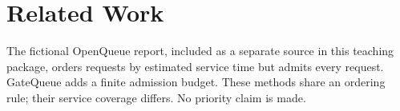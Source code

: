 \section{Related Work}\label{sec:related}
The fictional OpenQueue report, included as a separate source in this teaching
package, orders requests by estimated service time but admits every request.
GateQueue adds a finite admission budget. These methods share an ordering rule;
their service coverage differs. No priority claim is made.
